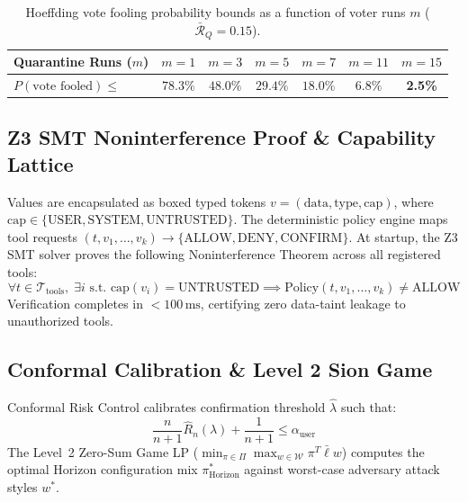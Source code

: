 \documentclass[10pt,a4paper]{article}
\begin{document}
\begin{table}[htbp]
\centering
\small
\caption{Hoeffding vote fooling probability bounds as a function of voter runs $m$ ($\bar{\mathcal{R}}_Q = 0.15$).}
\label{tab:hoeffding}
\begin{tabular}{lcccccc}
\toprule
\textbf{Quarantine Runs ($m$)} & $m=1$ & $m=3$ & $m=5$ & $m=7$ & $m=11$ & $m=15$ \\
\midrule
$P(\text{vote fooled}) \le$ & $78.3\%$ & $48.0\%$ & $29.4\%$ & $18.0\%$ & $6.8\%$ & \textbf{2.5\%} \\
\bottomrule
\end{tabular}
\end{table}

\subsection{Z3 SMT Noninterference Proof \& Capability Lattice}
Values are encapsulated as boxed typed tokens $v = (\text{data}, \text{type}, \text{cap})$, where $\text{cap} \in \{\mathrm{USER}, \mathrm{SYSTEM}, \mathrm{UNTRUSTED}\}$.
The deterministic policy engine maps tool requests $(t, v_1, \dots, v_k) \to \{\mathrm{ALLOW}, \mathrm{DENY}, \mathrm{CONFIRM}\}$.
At startup, the Z3 SMT solver proves the following Noninterference Theorem across all registered tools:
\begin{equation}
\forall t \in \mathcal{T}_{\mathrm{tools}}, \; \exists i \text{ s.t. } \mathrm{cap}(v_i) = \mathrm{UNTRUSTED} \implies \mathrm{Policy}(t, v_1, \dots, v_k) \neq \mathrm{ALLOW}
\end{equation}
Verification completes in $<100\,\mathrm{ms}$, certifying zero data-taint leakage to unauthorized tools.

\subsection{Conformal Calibration \& Level 2 Sion Game}
Conformal Risk Control calibrates confirmation threshold $\hat{\lambda}$ such that:
\begin{equation}
\frac{n}{n+1} \hat{R}_n(\lambda) + \frac{1}{n+1} \le \alpha_{\mathrm{user}}
\end{equation}
The Level~2 Zero-Sum Game LP ($\min_{\pi \in \Pi} \max_{w \in \mathcal{W}} \pi^T \bar{\ell} w$) computes the optimal Horizon configuration mix $\pi^*_{\mathrm{Horizon}}$ against worst-case adversary attack styles $w^*$.
\end{document}
